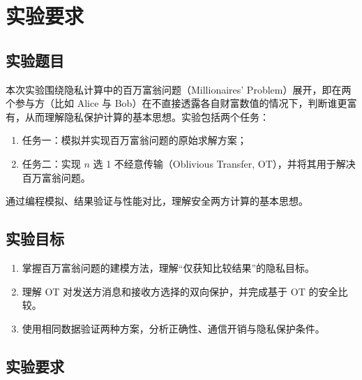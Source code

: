 \documentclass{SYSUReport}
\date{2026 年 9 月 24 日}
\begin{document}
\cover
\thispagestyle{empty}
\clearpage

\tableofcontents
\clearpage

\section{实验要求}

\subsection{实验题目}

本次实验围绕隐私计算中的百万富翁问题（Millionaires' Problem）展开，即在两个参与方（比如 Alice 与 Bob）在不直接透露各自财富数值的情况下，判断谁更富有，从而理解隐私保护计算的基本思想。实验包括两个任务：

\begin{enumerate}
    \item 任务一：模拟并实现百万富翁问题的原始求解方案；
    \item 任务二：实现 $n$ 选 1 不经意传输（Oblivious Transfer, OT），并将其用于解决百万富翁问题。
\end{enumerate}

通过编程模拟、结果验证与性能对比，理解安全两方计算的基本思想。

\subsection{实验目标}

\begin{enumerate}
    \item 掌握百万富翁问题的建模方法，理解“仅获知比较结果”的隐私目标。
    \item 理解 OT 对发送方消息和接收方选择的双向保护，并完成基于 OT 的安全比较。
    \item 使用相同数据验证两种方案，分析正确性、通信开销与隐私保护条件。
\end{enumerate}

\subsection{实验要求}
\end{document}
